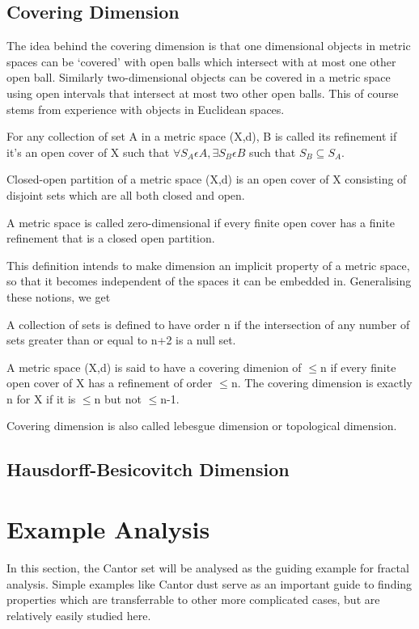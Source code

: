 \subsection{Covering Dimension}
The idea behind the covering dimension is that one dimensional objects in
metric spaces can be `covered' with open balls which intersect with at most
one other open ball. Similarly two-dimensional objects can be covered in a
metric space using open intervals that intersect at most two other open
balls. This of course stems from experience with objects in Euclidean spaces.
\begin{definition}
    For any collection of set A in a metric space (X,d), B is called its
    refinement if it's an open cover of X such that $\forall S_A \epsilon A,
    \exists S_B \epsilon B$ such that $ S_B \subseteq S_A$.
\end{definition}
\begin{definition}
    Closed-open partition of a metric space (X,d) is an open cover of X
    consisting of disjoint sets which are all both closed and open.
\end{definition}
\begin{definition}
    A metric space is called zero-dimensional if every finite open cover has a
    finite refinement that is a closed open partition.
\end{definition}
This definition intends to make dimension an implicit property of a metric
space, so that it becomes independent of the spaces it can be embedded in.
Generalising these notions, we get
\begin{definition}
    A collection of sets is defined to have order n if the intersection of any
    number of sets greater than or equal to n+2 is a null set.
\end{definition}
\begin{definition}
    A metric space (X,d) is said to have a covering dimenion of $\leqslant$n if
    every finite open cover of X has a refinement of order $\leqslant$n. The
    covering dimension is exactly n for X if it is $\leqslant$n but not
    $\leqslant$n-1.
\end{definition}
Covering dimension is also called lebesgue dimension or topological dimension.

\subsection{Hausdorff-Besicovitch Dimension}

\section{Example Analysis}
In this section, the Cantor set will be analysed as the guiding example for
fractal analysis.
Simple examples like Cantor dust serve as an important guide to finding
properties which are transferrable to other more complicated cases, but are
relatively easily studied here.
